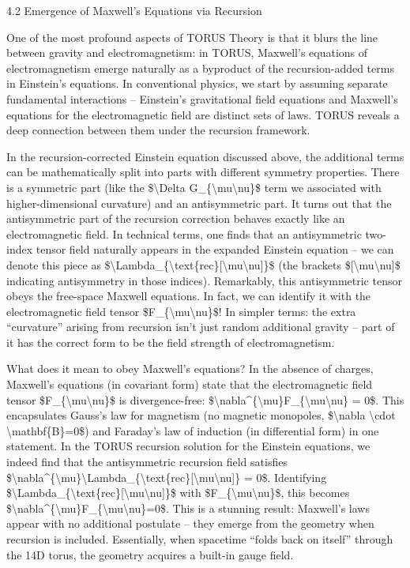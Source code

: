 \documentclass[
]{article}
\begin{document}
4.2 Emergence of Maxwell's Equations via Recursion

One of the most profound aspects of TORUS Theory is that it blurs the
line between gravity and electromagnetism: in TORUS, Maxwell's equations
of electromagnetism emerge naturally as a byproduct of the
recursion-added terms in Einstein's equations. In conventional physics,
we start by assuming separate fundamental interactions -- Einstein's
gravitational field equations and Maxwell's equations for the
electromagnetic field are distinct sets of laws. TORUS reveals a deep
connection between them under the recursion framework.

In the recursion-corrected Einstein equation discussed above, the
additional terms can be mathematically split into parts with different
symmetry properties. There is a symmetric part (like the
\$\textbackslash Delta G\_\{\textbackslash mu\textbackslash nu\}\$ term
we associated with higher-dimensional curvature) and an antisymmetric
part. It turns out that the antisymmetric part of the recursion
correction behaves exactly like an electromagnetic field. In technical
terms, one finds that an antisymmetric two-index tensor field naturally
appears in the expanded Einstein equation -- we can denote this piece as
\$\textbackslash Lambda\_\{\textbackslash text\{rec\}{[}\textbackslash mu\textbackslash nu{]}\}\$
(the brackets \${[}\textbackslash mu\textbackslash nu{]}\$ indicating
antisymmetry in those indices). Remarkably, this antisymmetric tensor
obeys the free-space Maxwell equations. In fact, we can identify it with
the electromagnetic field tensor
\$F\_\{\textbackslash mu\textbackslash nu\}\$! In simpler terms: the
extra ``curvature'' arising from recursion isn't just random additional
gravity -- part of it has the correct form to be the field strength of
electromagnetism.

What does it mean to obey Maxwell's equations? In the absence of
charges, Maxwell's equations (in covariant form) state that the
electromagnetic field tensor
\$F\_\{\textbackslash mu\textbackslash nu\}\$ is divergence-free:
\$\textbackslash nabla\^{}\{\textbackslash mu\}F\_\{\textbackslash mu\textbackslash nu\}
= 0\$. This encapsulates Gauss's law for magnetism (no magnetic
monopoles, \$\textbackslash nabla \textbackslash cdot
\textbackslash mathbf\{B\}=0\$) and Faraday's law of induction (in
differential form) in one statement. In the TORUS recursion solution for
the Einstein equations, we indeed find that the antisymmetric recursion
field satisfies
\$\textbackslash nabla\^{}\{\textbackslash mu\}\textbackslash Lambda\_\{\textbackslash text\{rec\}{[}\textbackslash mu\textbackslash nu{]}\}
= 0\$. Identifying
\$\textbackslash Lambda\_\{\textbackslash text\{rec\}{[}\textbackslash mu\textbackslash nu{]}\}\$
with \$F\_\{\textbackslash mu\textbackslash nu\}\$, this becomes
\$\textbackslash nabla\^{}\{\textbackslash mu\}F\_\{\textbackslash mu\textbackslash nu\}=0\$.
This is a stunning result: Maxwell's laws appear with no additional
postulate -- they emerge from the geometry when recursion is included.
Essentially, when spacetime ``folds back on itself'' through the 14D
torus, the geometry acquires a built-in gauge field.
\end{document}
